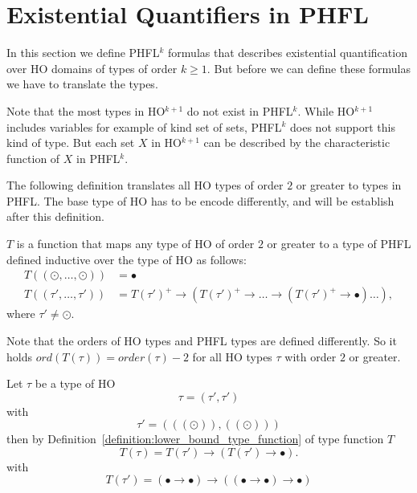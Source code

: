 

\section{Existential Quantifiers in PHFL}\label{sec:existential_quantifiers_in_phfl}

In this section we define PHFL$^{k}$ formulas that describes existential quantification over HO domains of types of
order $k \geq 1$. But before we can define these formulas we have to translate the types.

Note that the most types in HO$^{k + 1}$ do not exist in PHFL$^k$. While HO$^{k +
1}$ includes variables for example of kind set of sets, PHFL$^k$ does not support this kind of type.
But each set $X$ in HO$^{k+1}$ can be described by the characteristic function of $X$ in PHFL$^k$.

The following definition translates all HO types of order $2$ or greater to types in PHFL. The base type of HO
has to be encode differently, and will be establish after this definition.

\begin{definition}
    \label{definition:lower_bound_type_function}
    $T$ is a function that maps any type of HO of order $2$ or greater to a type of PHFL defined inductive over the
    type of HO as follows:
    \begin{align*}
        T((\odot, \dots, \odot)) &= \bullet\\
        T((\tau', \dots, \tau')) &= T(\tau')^+ \rightarrow (T(\tau')^+ \rightarrow \dots \rightarrow (T(\tau')^+
        \rightarrow \bullet) \dots ),
    \end{align*}
    where $\tau' \neq \odot$.
\end{definition}

Note that the orders of HO types and PHFL types are defined differently. So it holds $ord(T(\tau)) = order(\tau) - 2$
for all HO types $\tau$ with order $2$ or greater.

\begin{example}
    Let $\tau$ be a type of HO
    \[\tau = (\tau', \tau')\]
    with
    \[\tau' = (((\odot)), ((\odot)))\]
    then by Definition~\ref{definition:lower_bound_type_function} of type function $T$
    \[T(\tau) = T(\tau') \rightarrow (T(\tau') \rightarrow \bullet).\]
    with
    \[T(\tau') = (\bullet \rightarrow \bullet) \rightarrow ((\bullet \rightarrow \bullet) \rightarrow \bullet)\]
\end{example}

